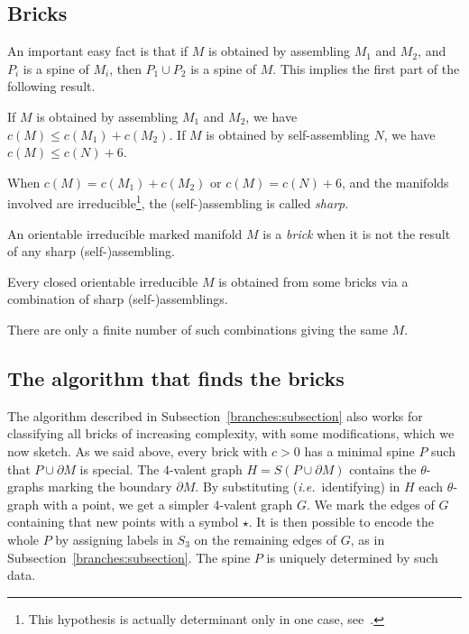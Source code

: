 \documentclass[10pt]{article}      %
\begin{document}
\subsection{Bricks} 
An important easy fact is that if $M$ is obtained by assembling $M_1$ and $M_2$, and
$P_i$ is a spine of $M_i$, then $P_1\cup P_2$ is a spine of $M$. This implies
the first part of the following result.

\begin{proposition} If $M$ is obtained by assembling
$M_1$ and $M_2$, we have $c(M)\leqslant c(M_1)+c(M_2)$. If $M$ is obtained by
self-assembling $N$, we have $c(M)\leqslant c(N)+6$.
\end{proposition}

When $c(M)=c(M_1)+c(M_2)$ or $c(M)=c(N)+6$, and the manifolds involved are 
irreducible\footnote{This hypothesis is actually determinant only in one case, see~\cite{MaPe}.},
the (self-)assembling is called \emph{sharp}.
\begin{defn} An orientable irreducible marked manifold $M$ is a \emph{brick} when
it is not the result of any sharp (self-)assembling.
\end{defn}

\begin{theorem}
Every closed orientable irreducible $M$ is obtained from some bricks
via a combination of sharp (self-)assemblings.
\end{theorem}
There are only a finite number of such combinations giving the same $M$. 

\subsection{The algorithm that finds the bricks}
The algorithm described in Subsection~\ref{branches:subsection} also works 
for classifying all bricks
of increasing complexity, with some modifications, which we now sketch.
As we said above, every brick with $c>0$ has a minimal spine $P$ such that $P\cup\partial M$
is special. The $4$-valent graph $H=S(P\cup\partial M)$ contains the $\theta$-graphs marking
the boundary $\partial M$. By substituting (\emph{i.e.}~identifying) in $H$ 
each $\theta$-graph
with a point, we get a simpler $4$-valent graph $G$. We mark
the edges of $G$ containing that new points with a symbol $\star$.
It is then possible to encode the whole $P$ by assigning labels in $S_3$ on
the remaining edges of $G$, as in Subsection~\ref{branches:subsection}. The spine $P$
is uniquely determined by such data.
\end{document}
